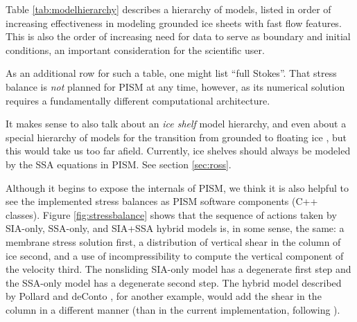 \documentclass[titlepage,letterpaper,final]{scrartcl}
\begin{document}
Table \ref{tab:modelhierarchy} describes a hierarchy of models, listed in order of increasing effectiveness in modeling grounded ice sheets with fast flow features.  This is also the order of increasing need for data to serve as boundary and initial conditions, an important consideration for the scientific user.

As an additional row for such a table, one might list ``full Stokes''.  That stress balance is \emph{not} planned for PISM at any time, however, as its numerical solution requires a fundamentally different computational architecture.

It makes sense to also talk about an \emph{ice shelf} model hierarchy, and even about a special hierarchy of models for the transition from grounded to floating ice \cite{SchoofMarine1}, but this would take us too far afield.  Currently, ice shelves should always be modeled by the SSA equations in PISM.  See section \ref{sec:ross}.

Although it begins to expose the internals of PISM, we think it is also helpful to see the implemented stress balances as PISM software components (C++ classes).  Figure \ref{fig:stressbalance} shows that the sequence of actions taken by SIA-only, SSA-only, and SIA+SSA hybrid models is, in some sense, the same: a membrane stress solution first, a distribution of vertical shear in the column of ice second, and a use of incompressibility to compute the vertical component of the velocity third.  The nonsliding SIA-only model has a degenerate first step and the SSA-only model has a degenerate second step.  The hybrid model described by Pollard and deConto \cite{PollardDeConto}, for another example, would add the shear in the column in a different manner (than in the current implementation, following \cite{BBssasliding,Winkelmannetal2011}).

\newenvironment{tightlist}{\begin{itemize}  \vspace{-0.15in}\addtolength{\itemsep}{-0.5\baselineskip} } {\vspace{-0.1in} \end{itemize}}

\newcommand{\nolist}[1]{[\emph{#1}] \vspace{0.1in}}
\end{document}
